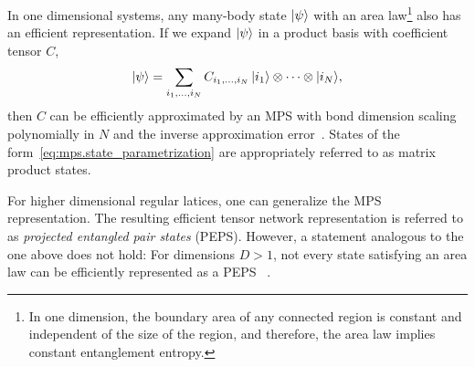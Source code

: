 In one dimensional systems, any many-body state $\ket{\psi}$ with an area law\footnote{%
  In one dimension, the boundary area of any connected region is constant and independent of the size of the region, and therefore, the area law implies constant entanglement entropy.
}
also has an efficient representation.
If we expand $\ket{\psi}$ in a product basis with coefficient tensor $C$,
\[
  \ket\psi = \sum_{i_1,\ldots,i_N} C_{i_1,\ldots,i_N} \, \ket{i_1} \otimes \cdots \otimes \ket{i_N},
  \label{eq:mps.state_parametrization}
\]
then $C$ can be efficiently approximated by an MPS with bond dimension scaling polynomially in $N$ and the inverse approximation error~\cite{Hastings_2006_Solving,Verstraete_2006_Matrix,Eisert_2010_Colloquium,Arad_2013_Area,Arad_2016_Rigorous}.
States of the form~\eqref{eq:mps.state_parametrization} are appropriately referred to as matrix product states.

For higher dimensional regular latices, one can generalize the MPS representation.
The resulting efficient tensor network representation is referred to as \emph{projected entangled pair states} (PEPS).
However, a statement analogous to the one above does not hold:
For dimensions $D > 1$, not every state satisfying an area law can be efficiently represented as a PEPS~\cite{Ge_2016_Area}
.\\


